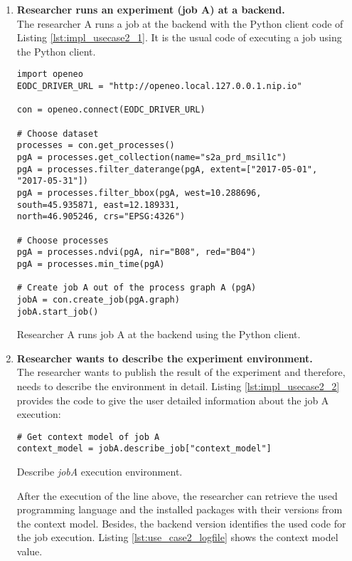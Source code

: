 \documentclass[draft,final]{vutinfth} %
\newenvironment{code}{\captionsetup{type=listing}}{}
\begin{document}
\begin{enumerate}
	\item \textbf{Researcher runs an experiment (job A) at a backend.}\\
	The researcher A runs a job at the backend with the Python client code of Listing \ref{lst:impl_usecase2_1}.  It is the usual code of executing a job using the Python client. 

\begin{code}
	\begin{verbatim}
import openeo
EODC_DRIVER_URL = "http://openeo.local.127.0.0.1.nip.io"

con = openeo.connect(EODC_DRIVER_URL)

# Choose dataset
processes = con.get_processes()
pgA = processes.get_collection(name="s2a_prd_msil1c")
pgA = processes.filter_daterange(pgA, extent=["2017-05-01", 
"2017-05-31"])
pgA = processes.filter_bbox(pgA, west=10.288696, 
south=45.935871, east=12.189331, 
north=46.905246, crs="EPSG:4326")

# Choose processes
pgA = processes.ndvi(pgA, nir="B08", red="B04")
pgA = processes.min_time(pgA)

# Create job A out of the process graph A (pgA)
jobA = con.create_job(pgA.graph)
jobA.start_job()
	\end{verbatim}
	\caption{Researcher A runs job A at the backend using the Python client.}
	\label{lst:impl_usecase2_1}
\end{code}
\newpage
	\item \textbf{Researcher wants to describe the experiment environment.}\\
	The researcher wants to publish the result of the experiment and therefore, needs to describe the environment in detail. Listing \ref{lst:impl_usecase2_2} provides the code to give the user detailed information about the job A execution:

\begin{code}
	\begin{verbatim}
# Get context model of job A
context_model = jobA.describe_job["context_model"]
	\end{verbatim}
	\caption{Describe \textit{jobA} execution environment.}
	\label{lst:impl_usecase2_2}
\end{code}
	After the execution of the line above, the researcher can retrieve the used programming language and the installed packages with their versions from the context model. Besides, the backend version identifies the used code for the job execution. Listing \ref{lst:use_case2_logfile} shows the context model value.
\end{enumerate}
\end{document}
